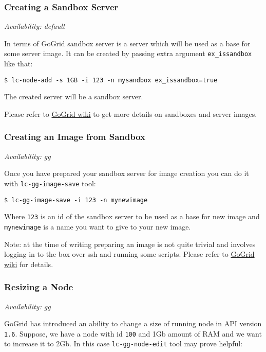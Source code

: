 \documentclass[a4paper]{report}
\begin{document}
\subsubsection{Creating a Sandbox Server}

\textit{Availability: default}

In terms of GoGrid sandbox server is a server which will be used as a base for
some server image. It can be created by passing extra argument {\tt ex\_issandbox}
like that:

\begin{verbatim}
$ lc-node-add -s 1GB -i 123 -n mysandbox ex_issandbox=true
\end{verbatim}


The created server will be a sandbox server.


Please refer to \href{http://wiki.gogrid.com/wiki/index.php/MyGSI}{GoGrid wiki} to get
more details on sandboxes and server images.

\subsubsection{Creating an Image from Sandbox}

\textit{Availability: gg}

Once you have prepared your sandbox server for image creation you can do it with
\texttt{lc-gg-image-save} tool:

\begin{verbatim}
$ lc-gg-image-save -i 123 -n mynewimage
\end{verbatim}

Where \texttt{123} is an id of the sandbox server to be used as a base for new image and
\texttt{mynewimage} is a name you want to give to your new image.

Note: at the time of writing preparing an image is not quite trivial and involves logging in
to the box over ssh and running some scripts. Please refer to 
\href{http://wiki.gogrid.com/wiki/index.php/MyGSI}{GoGrid wiki} for details.

\subsubsection{Resizing a Node}

\textit{Availability: gg}

GoGrid has introduced an ability to change a size of running node in API version \texttt{1.6}.
Suppose, we have a node with id \texttt{100} and 1Gb amount of RAM and we want to increase it
to 2Gb. In this case \texttt{lc-gg-node-edit} tool may prove helpful:
\end{document}

